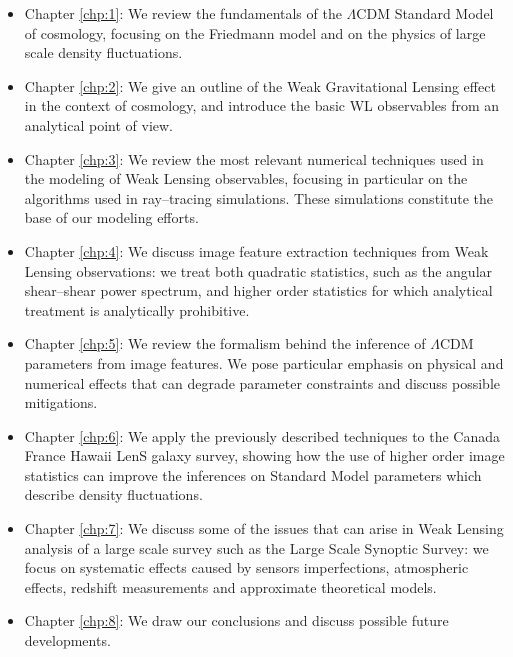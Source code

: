 \begin{itemize}
	\item Chapter \ref{chp:1}: We review the fundamentals of the $\Lambda$CDM Standard Model of cosmology, focusing on the Friedmann model and on the physics of large scale density fluctuations.
	\item Chapter \ref{chp:2}: We give an outline of the Weak Gravitational Lensing effect in the context of cosmology, and introduce the basic WL observables from an analytical point of view.
	\item Chapter \ref{chp:3}: We review the most relevant numerical techniques used in the modeling of Weak Lensing observables, focusing in particular on the algorithms used in ray--tracing simulations. These simulations constitute the base of our modeling efforts.  
	\item Chapter \ref{chp:4}: We discuss image feature extraction techniques from Weak Lensing observations: we treat both quadratic statistics, such as the angular shear--shear power spectrum, and higher order statistics for which analytical treatment is analytically prohibitive.
	\item Chapter \ref{chp:5}: We review the formalism behind the inference of $\Lambda$CDM parameters from image features. We pose particular emphasis on physical and numerical effects that can degrade parameter constraints and discuss possible mitigations.
	\item Chapter \ref{chp:6}: We apply the previously described techniques to the Canada France Hawaii LenS galaxy survey, showing how the use of higher order image statistics can improve the inferences on Standard Model parameters which describe density fluctuations. 
	\item Chapter \ref{chp:7}: We discuss some of the issues that can arise in Weak Lensing analysis of a large scale survey such as the Large Scale Synoptic Survey: we focus on systematic effects caused by sensors imperfections, atmospheric effects, redshift measurements and approximate theoretical models.
	\item Chapter \ref{chp:8}: We draw our conclusions and discuss possible future developments.
\end{itemize}